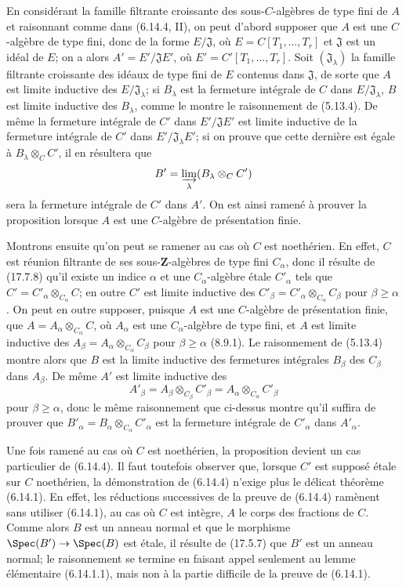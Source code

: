 En considérant la famille filtrante croissante des sous-$C$-algèbres de type fini de $A$ et raisonnant comme dans (6.14.4, II), on peut d'abord supposer que $A$ est une $C$-algèbre de type fini, donc de la forme $E/\mathfrak J$, où $E=C[T_1,\ldots,T_r]$ et $\mathfrak J$ est un idéal de $E$; on a alors $A'=E'/\mathfrak JE'$, où $E'=C'[T_1,\ldots,T_r]$. Soit $(\mathfrak J_\lambda)$ la famille filtrante croissante des idéaux de type fini de $E$ contenus dans $\mathfrak J$, de sorte que $A$ est limite inductive des $E/\mathfrak J_\lambda$; si $B_\lambda$ est la fermeture intégrale de $C$ dans $E/\mathfrak J_\lambda$, $B$ est limite inductive des $B_\lambda$, comme le montre le raisonnement de (5.13.4). De même la fermeture intégrale de $C'$ dans $E'/\mathfrak JE'$ est limite inductive de la fermeture intégrale de $C'$ dans $E'/\mathfrak J_\lambda E'$; si on prouve que cette dernière est égale à $B_\lambda\otimes_C C'$, il en résultera que
\[
  B'=\varinjlim_\lambda(B_\lambda\otimes_C C')
\]
sera la fermeture intégrale de $C'$ dans $A'$. On est ainsi ramené à prouver la proposition lorsque $A$ est une $C$-algèbre de présentation finie.

Montrons ensuite qu'on peut se ramener au cas où $C$ est noethérien. En effet, $C$ est réunion filtrante de ses sous-$\mathbf Z$-algèbres de type fini $C_\alpha$, donc il résulte de (17.7.8) qu'il existe un indice $\alpha$ et une $C_\alpha$-algèbre étale $C'_\alpha$ tels que $C'=C'_\alpha\otimes_{C_\alpha}C$; en outre $C'$ est limite inductive des $C'_\beta=C'_\alpha\otimes_{C_\alpha}C_\beta$ pour $\beta\geq\alpha$. On peut en outre supposer, puisque $A$ est une $C$-algèbre de présentation finie, que $A=A_\alpha\otimes_{C_\alpha}C$, où $A_\alpha$ est une $C_\alpha$-algèbre de type fini, et $A$ est limite inductive des $A_\beta=A_\alpha\otimes_{C_\alpha}C_\beta$ pour $\beta\geq\alpha$ (8.9.1). Le raisonnement de (5.13.4) montre alors que $B$ est la limite inductive des fermetures intégrales $B_\beta$ des $C_\beta$ dans $A_\beta$. De même $A'$ est limite inductive des
\[
  A'_\beta=A_\beta\otimes_{C_\beta}C'_\beta=A_\alpha\otimes_{C_\alpha}C'_\beta
\]
pour $\beta\geq\alpha$, donc le même raisonnement que ci-dessus montre qu'il suffira de prouver que $B'_\alpha=B_\alpha\otimes_{C_\alpha}C'_\alpha$ est la fermeture intégrale de $C'_\alpha$ dans $A'_\alpha$.

Une fois ramené au cas où $C$ est noethérien, la proposition devient un cas particulier de (6.14.4). Il faut toutefois observer que, lorsque $C'$ est supposé étale sur $C$ noethérien, la démonstration de (6.14.4) n'exige plus le délicat théorème (6.14.1). En effet, les réductions successives de la preuve de (6.14.4) ramènent sans utiliser (6.14.1), au cas où $C$ est intègre, $A$ le corps des fractions de $C$. Comme alors $B$ est un anneau normal et que le morphisme $\Spec(B')\to\Spec(B)$ est étale, il résulte de (17.5.7) que $B'$ est un anneau normal; le raisonnement se termine en faisant appel seulement au lemme élémentaire (6.14.1.1), mais non à la partie difficile de la preuve de (6.14.1).

